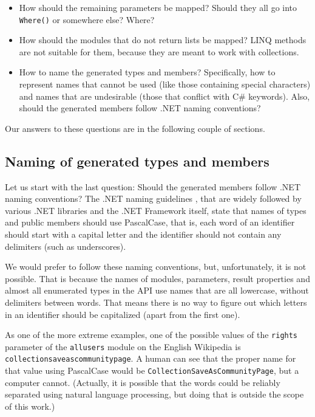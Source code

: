 \begin{itemize}
\item How should the remaining parameters be mapped?
Should they all go into \lstinline{Where()} or somewhere else? Where?
\item How should the modules that do not return lists be mapped?
\ac{LINQ} methods are not suitable for them, because they are meant to work with collections.
\item How to name the generated types and members?
Specifically, how to represent names that cannot be used (like those containing special characters)
and names that are undesirable (those that conflict with C\# keywords).
Also, should the generated members follow .NET naming conventions?
\end{itemize}

Our answers to these questions are in the following couple of sections.

\subsection{Naming of generated types and members}
\label{ltwc-naming}

Let us start with the last question: Should the generated members follow .NET naming conventions?
The .NET naming guidelines \cite{guidelines-for-names},
that are widely followed by various .NET libraries and the .NET Framework itself,
state that names of types and public members should use PascalCase,
that is, each word of an identifier should start with a capital letter
and the identifier should not contain any delimiters (such as underscores).

We would prefer to follow these naming conventions, but, unfortunately, it is not possible.
That is because the names of modules, parameters, result properties and almost all enumerated types in the \ac{API}
use names that are all lowercase, without delimiters between words.
That means there is no way to figure out which letters in an identifier should be capitalized
(apart from the first one).

As one of the more extreme examples,
one of the possible values of the \texttt{rights} parameter
of the \texttt{allusers} module on the English Wikipedia is \texttt{collection\-save\-as\-community\-page}.
A human can see that the proper name for that value using PascalCase would be \lstinline{CollectionSaveAsCommunityPage},
but a computer cannot.
(Actually, it is possible that the words could be reliably separated using natural language processing,
but doing that is outside the scope of this work.)

